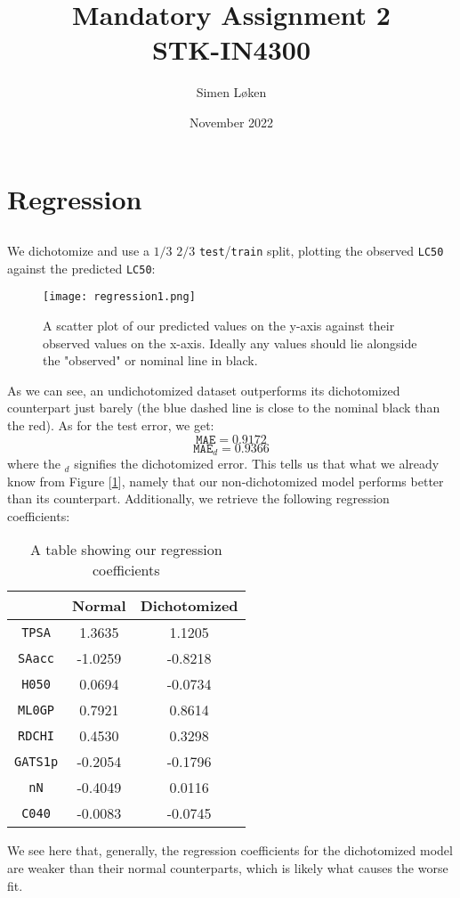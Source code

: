 \documentclass{article}
\title{%
Mandatory Assignment 2 \\
\large STK-IN4300}
\author{Simen Løken}
\date{November 2022}
\begin{document}
\maketitle
\renewcommand{\thesection}{Problem \arabic{section}}
\renewcommand{\thesubsection}{\arabic{subsection})}
\section{Regression}
\subsection{}
We dichotomize and use a $1/3$ $2/3$ \texttt{test}/\texttt{train} split, plotting the observed \texttt{LC50} against the predicted \texttt{LC50}:
\begin{figure}[ht!]
    \centering
    \texttt{[image: regression1.png]}
    \caption{A scatter plot of our predicted values on the y-axis against their observed values on the x-axis. Ideally any values should lie alongside the "observed" or nominal line in black.}
    \label{figR1}
\end{figure} \newline
As we can see, an undichotomized dataset outperforms its dichotomized counterpart just barely (the blue dashed line is close to the nominal black than the red). \newline As for the test error, we get:
\begin{equation*}
    \texttt{MAE} = 0.9172
\end{equation*}
\begin{equation*}
    \texttt{MAE}_d = 0.9366
\end{equation*}
where the $_d$ signifies the dichotomized error. This tells us that what we already know from Figure [\ref{figR1}], namely that our non-dichotomized model performs better than its counterpart. \newpage
Additionally, we retrieve the following regression coefficients:
\begin{table}[ht!]
    \centering
    \begin{tabular}{c|c|c|}
         &Normal& Dichotomized \\
         \hline
         \texttt{TPSA}& 1.3635& 1.1205 \\
         \texttt{SAacc}&-1.0259& -0.8218 \\
         \texttt{H050}&0.0694& -0.0734 \\
         \texttt{ML0GP}&0.7921& 0.8614 \\
         \texttt{RDCHI}&0.4530& 0.3298 \\
         \texttt{GATS1p}&-0.2054& -0.1796 \\
         \texttt{nN}&-0.4049& 0.0116 \\
        \texttt{C040}& -0.0083& -0.0745 \\

    \end{tabular}
    \caption{A table showing our regression coefficients}
    \label{tabR1}
\end{table} \newline
We see here that, generally, the regression coefficients for the dichotomized model are weaker than their normal counterparts, which is likely what causes the worse fit.
\end{document}
